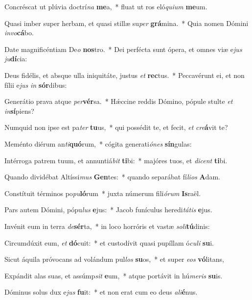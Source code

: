 \item Concréscat ut plúvia doctrí\textit{na} \textbf{me}a,~* fluat ut ros eló\textit{qui}\textit{um} \textbf{me}um.
\item Quasi imber super herbam, et quasi stillæ su\textit{per} \textbf{grá}mina.~* Quia nomen Dómini \textit{in}\textit{vo}\textbf{cá}bo.
\item Date magnificéntiam De\textit{o} \textbf{nos}tro.~* Dei perfécta sunt ópera, et omnes viæ e\textit{jus} \textit{ju}\textbf{dí}cia:
\item Deus fidélis, et absque ulla iniquitáte, justus \textit{et} \textbf{rec}tus.~* Peccavérunt ei, et non fílii e\textit{jus} \textit{in} \textbf{sór}dibus:
\item Generátio prava atque \textit{per}\textbf{vér}sa.~* Hǽccine reddis Dómino, pópule stulte \textit{et} \textit{in}\textbf{sí}piens?
\item Numquid non ipse est pa\textit{ter} \textbf{tu}us,~* qui possédit te, et fecit, \textit{et} \textit{cre}\textbf{á}vit te?
\item Meménto diérum an\textit{ti}\textbf{quó}rum,~* cógita generati\textit{ó}\textit{nes} \textbf{sín}gulas:
\item Intérroga patrem tuum, et annuntiá\textit{bit} \textbf{ti}bi:~* majóres tuos, et \textit{di}\textit{cent} \textbf{ti}bi.
\item Quando dividébat Altíssi\textit{mus} \textbf{Gen}tes:~* quando separábat fí\textit{li}\textit{os} \textbf{A}dam.
\item Constítuit términos po\textit{pu}\textbf{ló}rum~* juxta númerum fili\textit{ó}\textit{rum} \textbf{Is}raël.
\item Pars autem Dómini, pópu\textit{lus} \textbf{e}jus:~* Jacob funículus heredi\textit{tá}\textit{tis} \textbf{e}jus.
\item Invénit eum in terra \textit{de}\textbf{sér}ta,~* in loco horróris et vastæ \textit{so}\textit{li}\textbf{tú}dinis:
\item Circumdúxit eum, \textit{et} \textbf{dó}cuit:~* et custodívit quasi pupíllam ó\textit{cu}\textit{li} \textbf{su}i.
\item Sicut áquila próvocans ad volándum pul\textit{los} \textbf{su}os,~* et super \textit{e}\textit{os} \textbf{vó}litans,
\item Expándit alas suas, et assúmp\textit{sit} \textbf{e}um,~* atque portávit in hú\textit{me}\textit{ris} \textbf{su}is.
\item Dóminus solus dux e\textit{jus} \textbf{fu}it:~* et non erat cum eo deus \textit{a}\textit{li}\textbf{é}nus.
